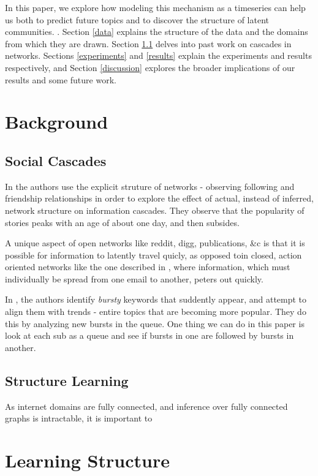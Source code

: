 \documentclass{article} %
\begin{document}
In this paper, we explore how modeling this mechanism as a timeseries can help us both to predict future topics and to discover the structure of latent communities. . Section \ref{data} explains the structure of the data and the domains from which they are drawn. Section \ref{cascades} delves into past work on cascades in networks. Sections \ref{experiments} and \ref{results} explain the experiments and results respectively, and Section \ref{discussion} explores the broader implications of our results and some future work. 

\section{Background}

\subsection{Social Cascades}
\label{cascades}

In \cite{info_contag} the authors use the explicit struture of networks - observing following and friendship relationships in order to explore the effect of actual, instead of inferred, network structure on information cascades. They observe that the popularity of stories peaks with an age of about one day, and then subsides. 

A unique aspect of open networks like reddit, digg, publications, \&c is that it is possible for information to latently travel quicly, as opposed toin closed, action oriented networks like the one described in \cite{viral_dynamics}, where information, which must individually be spread from one email to another, peters out quickly.

In \cite{twitter_trend}, the authors identify \textit{bursty} keywords that suddently appear, and attempt to align them with trends - entire topics that are becoming more popular. They do this by analyzing new bursts in the queue. One thing we can do in this paper is look at each sub as a queue and see if bursts in one are followed by bursts in another.

\subsection{Structure Learning}

As internet domains are fully connected, and inference over fully connected graphs is intractable, it is important to 
\section{Learning Structure}
\end{document}
